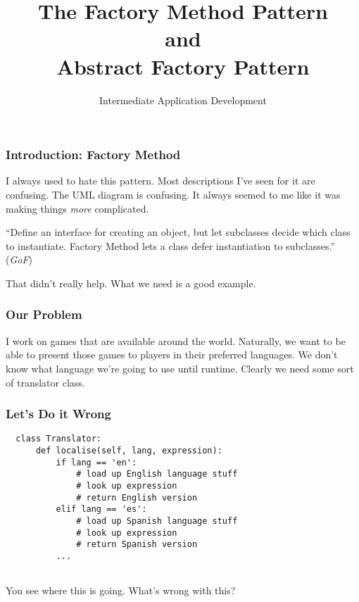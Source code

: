 \documentclass[10pt]{beamer}
\title{The Factory Method Pattern \\ and \\ Abstract Factory Pattern}
\author[IN608]{Intermediate Application Development}
\institute[Otago Polytechnic]{
  Otago Polytechnic \\
  Dunedin, New Zealand \\
  Kaiako: Tom Clark
}
\date{}
\begin{document}
\begin{frame}[plain]
  \titlepage
\end{frame}

\begin{frame}[fragile]
  \frametitle{Introduction: Factory Method}
  
  I always used to hate this pattern. Most descriptions I've seen for it are
  confusing. The UML diagram is confusing. It always seemed to me like it was 
  making things \emph{more} complicated.
  
  \vspace{5mm}
  ``Define an interface for creating an object, but let subclasses decide which class
  to instantiate. Factory Method lets a class defer instantiation to subclasses.'' \\
  (\emph{GoF})
  
  That didn't really help. What we need is a good example.

  
  \end{frame}
\begin{frame}
  \frametitle{Our Problem}
  
  I work on games that are available around the world. Naturally, we
  want to be able to present those games to players in their preferred 
  languages. We don't know what language we're going to use until 
  runtime. Clearly we need some sort of translator class.  
  \end{frame}
  

\begin{frame}[fragile]
  \frametitle{Let's Do it Wrong}

  \begin{verbatim}
  class Translator:
      def localise(self, lang, expression):
          if lang == 'en':
              # load up English language stuff
              # look up expression
              # return English version
          elif lang == 'es':
              # load up Spanish language stuff
              # look up expression
              # return Spanish version
          ...
       
  \end{verbatim}
  You see where this is going. What's wrong with this?
 \end{frame} 
\end{document}
